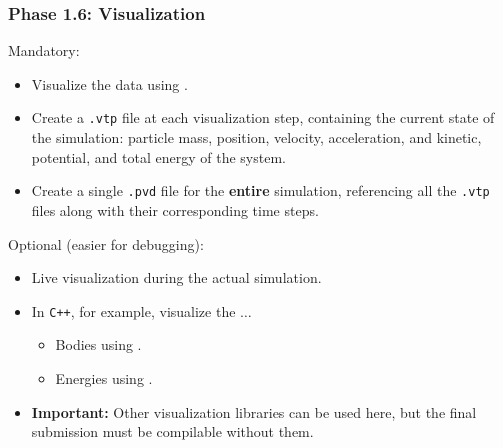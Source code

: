 \begin{frame}[fragile]
  \frametitle{Phase 1.6: Visualization}
  Mandatory:
  \begin{itemize}
      \item Visualize the data using .
      \item Create a \texttt{.vtp} file at each visualization step, containing the current state of the simulation: particle mass, position, velocity, acceleration, and kinetic, potential, and total energy of the system.
      \item Create a single \texttt{.pvd} file for the \textbf{entire} simulation, referencing all the \texttt{.vtp} files along with their corresponding time steps.
  \end{itemize}
  \vfill
  \pause
  Optional (easier for debugging):
  \begin{itemize}
    \item Live visualization during the actual simulation.
    \item In \texttt{C++}, for example, visualize the $\dots$
    \begin{itemize}
        \item Bodies using .
        \item Energies using .
    \end{itemize}
    \item \textbf{Important:} Other visualization libraries can be used here, but the final submission must be compilable without them.
  \end{itemize}
\end{frame}

